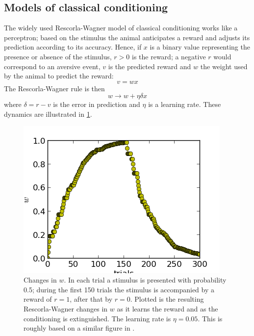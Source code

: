 \documentclass[11pt,a4paper]{scrartcl}
\begin{document}
\subsection*{Models of classical conditioning}

The widely used Rescorla-Wagner model of classical conditioning works
\cite{RescorlaWagner1972a} like a perceptron; based on the stimulus
the animal anticipates a reward and adjusts its prediction according
to its accuracy. Hence, if $x$ is a binary value representing the
presence or absence of the stimulus, $r>0$ is the reward; a negative
$r$ would correspond to an aversive event, $v$ is the predicted reward and $w$ the weight used by the animal to predict the reward:
\begin{equation}
v=wx
\end{equation}
The Rescorla-Wagner rule is then
\begin{equation}
w\rightarrow w+\eta \delta x
\end{equation}
where $\delta =r-v$ is the error in prediction and $\eta$ is a
learning rate. These dynamics are illustrated in \ref{fig:w}.

\begin{figure}
\begin{center}
\includegraphics{RW.png}%
\end{center}
\caption{Changes in $w$. In each trial a stimulus is presented with probability 0.5; during the first 150 trials the stimulus is accompanied by a reward of $r=1$, after that by $r=0$. Plotted is the resulting Rescorla-Wagner changes in $w$ as it learns the reward and as the conditioning is extinguished. The learning rate is $\eta=0.05$. This is roughly based on a similar figure in \cite{DayanAbbott2001a}. \label{fig:w}}
\end{figure}
\end{document}
